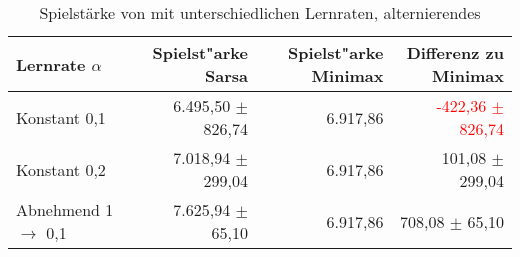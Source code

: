\begin{table}
\centering
\caption[Spielstärke \sarsa unterschiedliche Lernraten, alternierendes \splay]{Spielstärke von \sarsa mit unterschiedlichen Lernraten, alternierendes \splay}
\label{tab:playingAbility_sarsa_alternate}

\begin{tabular}{lrrr}
\toprule
Lernrate $\alpha$ &  Spielst"arke Sarsa & Spielst"arke Minimax & Differenz zu Minimax \\ \midrule
Konstant 0,1                    & 6.495,50 $\pm$ 826,74             & 6.917,86      & \textcolor{red}{-422,36 $\pm$ 826,74} \\
Konstant 0,2                    & 7.018,94 $\pm$ 299,04             & 6.917,86      & 101,08 $\pm$ 299,04 \\
Abnehmend 1 $\rightarrow$ 0,1   & 7.625,94 $\pm$ \phantom{0}65,10   & 6.917,86      & 708,08 $\pm$ \phantom{0}65,10 \\ \bottomrule

\end{tabular}

\end{table}